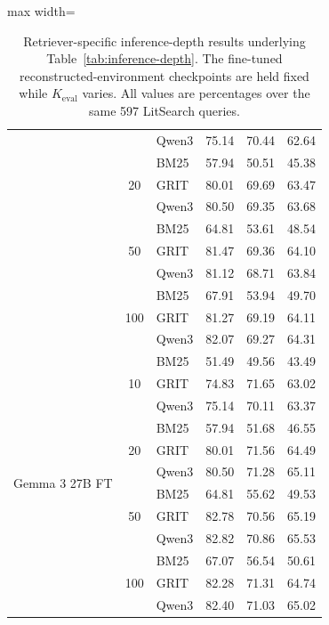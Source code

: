 \documentclass[pdflatex,sn-basic,Numbered]{sn-jnl}%
\theoremstyle{thmstyleone}%
\theoremstyle{thmstyletwo}%
\theoremstyle{thmstylethree}%
\begin{document}
\begin{table}[htbp]
\begin{adjustbox}{max width=\linewidth}
\begin{tabular}{l c l c c c}
 &                       & Qwen3 & 75.14 & 70.44 & 62.64 \\
 & \multirow{3}{*}{20}  & BM25  & 57.94 & 50.51 & 45.38 \\
 &                       & GRIT  & 80.01 & 69.69 & 63.47 \\
 &                       & Qwen3 & 80.50 & 69.35 & 63.68 \\
 & \multirow{3}{*}{50}  & BM25  & 64.81 & 53.61 & 48.54 \\
 &                       & GRIT  & 81.47 & 69.36 & 64.10 \\
 &                       & Qwen3 & 81.12 & 68.71 & 63.84 \\
 & \multirow{3}{*}{100} & BM25  & 67.91 & 53.94 & 49.70 \\
 &                       & GRIT  & 81.27 & 69.19 & 64.11 \\
 &                       & Qwen3 & 82.07 & 69.27 & 64.31 \\
\hline
\multirow{12}{*}{Gemma 3 27B FT}
 & \multirow{3}{*}{10}  & BM25  & 51.49 & 49.56 & 43.49 \\
 &                       & GRIT  & 74.83 & 71.65 & 63.02 \\
 &                       & Qwen3 & 75.14 & 70.11 & 63.37 \\
 & \multirow{3}{*}{20}  & BM25  & 57.94 & 51.68 & 46.55 \\
 &                       & GRIT  & 80.01 & 71.56 & 64.49 \\
 &                       & Qwen3 & 80.50 & 71.28 & 65.11 \\
 & \multirow{3}{*}{50}  & BM25  & 64.81 & 55.62 & 49.53 \\
 &                       & GRIT  & 82.78 & 70.56 & 65.19 \\
 &                       & Qwen3 & 82.82 & 70.86 & 65.53 \\
 & \multirow{3}{*}{100} & BM25  & 67.07 & 56.54 & 50.61 \\
 &                       & GRIT  & 82.28 & 71.31 & 64.74 \\
 &                       & Qwen3 & 82.40 & 71.03 & 65.02 \\
\hline
\end{tabular}
\end{adjustbox}


\caption{Retriever-specific inference-depth results underlying
Table~\ref{tab:inference-depth}. The fine-tuned reconstructed-environment
checkpoints are held fixed while $K_{\mathrm{eval}}$ varies. All values are
percentages over the same 597 LitSearch queries.}
\label{tab:inference-depth-detailed}
\end{table}
\end{document}
